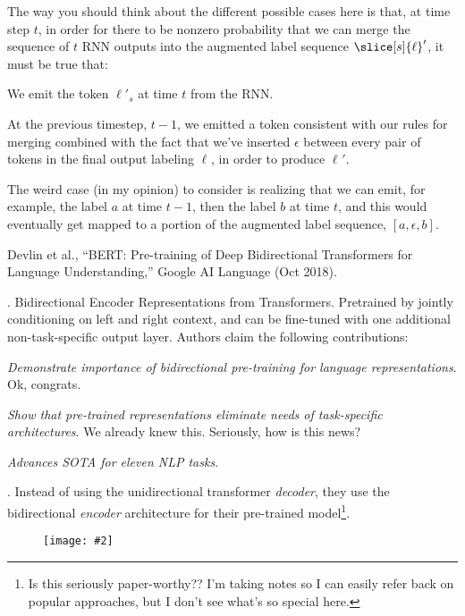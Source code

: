 \documentclass[11pt]{article}
\renewcommand\vec[2][]{\bm{#2}_{#1}}
\newcommand\myfig[2][0.3\textwidth]{\begin{figure}[h!]\centering\texttt{[image: \#2]}\end{figure}}
\newcommand\myspace[1][]{\vspace{#1\bigskipamount}}
\newcommand\p{\Needspace{10\baselineskip} \noindent}
\begin{document}
\p The way you should think about the different possible cases here is that, at time step $t$, in order for there to be nonzero probability that we can merge the sequence of $t$ RNN outputs into the augmented label sequence $\slice[s]{\ell}'$, it must be true that:
\begin{compactitem}
	\item We emit the token $\ell'_s$ at time $t$ from the RNN. 
	
	\item At the previous timestep, $t  - 1$, we emitted a token consistent with our rules for merging combined with the fact that we've inserted $\epsilon$ between every pair of tokens in the final output labeling $\vec\ell$, in order to produce $\vec{\ell}'$. 
\end{compactitem}
The weird case (in my opinion) to consider is realizing that we can emit, for example, the label $a$ at time $t - 1$, then the label $b$ at time $t$, and this would eventually get mapped to a portion of the augmented label sequence, $[a, \epsilon, b]$. 




\vspace{-1em}
{\footnotesize Devlin et al., ``BERT: Pre-training of Deep Bidirectional Transformers for Language Understanding,''  Google AI Language (Oct 2018).}


\p {}. Bidirectional Encoder Representations from Transformers. Pretrained by jointly conditioning on left and right context, and can be fine-tuned with one additional non-task-specific output layer. Authors claim the following contributions:
\begin{compactitem}
	\item \textit{Demonstrate importance of bidirectional pre-training for language representations}. Ok, congrats. 
	
	\item \textit{Show that pre-trained representations eliminate needs of task-specific architectures}. We already knew this. Seriously, how is this news?
	
	\item \textit{Advances SOTA for eleven NLP tasks}. 
\end{compactitem}

\myspace 
\p {}. Instead of using the unidirectional transformer \textit{decoder}, they use the bidirectional \textit{encoder} architecture for their pre-trained model\footnote{Is this seriously paper-worthy?? I'm taking notes so I can easily refer back on popular approaches, but I don't see what's so special here.}. 
\myfig[0.7\textwidth]{figs/bert_input.png}
\end{document}
